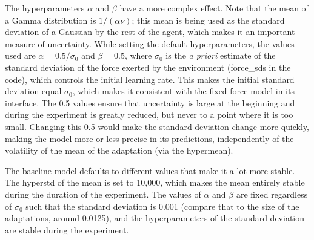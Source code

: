 \documentclass[a4paper,doc,floatsintext,natbib]{apa6}
\begin{document}
The hyperparameters $\alpha$ and $\beta$ have a more complex effect. Note that the
mean of a Gamma distribution is $1 / (\alpha \nu)$; this mean is being used
as the standard deviation of a Gaussian by the rest of the agent,
which makes it an important measure of uncertainty. While setting the default
hyperparameters, the values used are $\alpha = 0.5 / \sigma_0$ and
$\beta = 0.5$, where $\sigma_0$ is the \textit{a priori} estimate of the
standard deviation of the force exerted by the environment (force\_sds in the
code), which controls the initial learning rate. This makes the initial
standard deviation equal $\sigma_0$, which makes it consistent with the
fixed-force model in its interface. The 0.5 values ensure that uncertainty is
large at the beginning and during the experiment is greatly reduced, but never
to a point where it is too small. Changing this 0.5 would make the
standard deviation change more quickly, making the model more or less precise
in its predictions, independently of the volatility of the mean of the
adaptation (via the hypermean).

The baseline model defaults to different values that make it a lot more
stable. The hyperstd of the mean is set to 10,000, which makes the mean
entirely stable during the duration of the experiment. The values of $\alpha$
and $\beta$ are fixed regardless of $\sigma_0$ such that the standard deviation
is 0.001 (compare that to the size of the adaptations, around 0.0125), and the
hyperparameters of the standard deviation are stable during the experiment.



\end{document}
